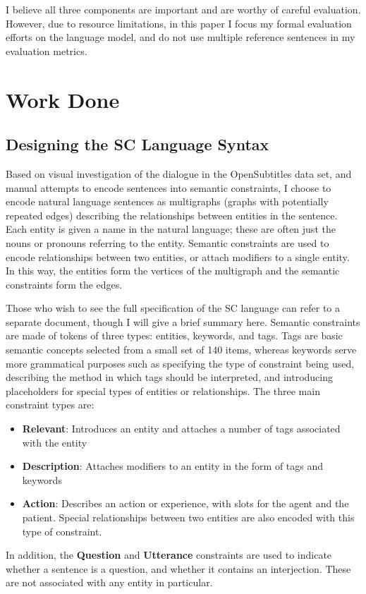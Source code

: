 \documentclass{article}
\numberwithin{equation}{section}
\begin{document}
I believe all three components are important and are worthy of careful evaluation. However, due to resource limitations, in this paper I focus my formal evaluation efforts on the language model, and do not use multiple reference sentences in my evaluation metrics.

\section{Work Done}

\subsection{Designing the SC Language Syntax}

Based on visual investigation of the dialogue in the OpenSubtitles data set, and manual attempts to encode sentences into semantic constraints, I choose to encode natural language sentences as multigraphs (graphs with potentially repeated edges) describing the relationships between entities in the sentence. Each entity is given a name in the natural language; these are often just the nouns or pronouns referring to the entity. Semantic constraints are used to encode relationships between two entities, or attach modifiers to a single entity. In this way, the entities form the vertices of the multigraph and the semantic constraints form the edges.

Those who wish to see the full specification of the SC language can refer to a separate document, though I will give a brief summary here. Semantic constraints are made of tokens of three types: entities, keywords, and tags. Tags are basic semantic concepts selected from a small set of 140 items, whereas keywords serve more grammatical purposes such as specifying the type of constraint being used, describing the method in which tags should be interpreted, and introducing placeholders for special types of entities or relationships. The three main constraint types are:
\begin{itemize}[topsep=0pt, partopsep=0pt, itemsep=2pt, parsep=0pt]
\item \textbf{Relevant}: Introduces an entity and attaches a number of tags associated with the entity
\item \textbf{Description}: Attaches modifiers to an entity in the form of tags and keywords
\item \textbf{Action}: Describes an action or experience, with slots for the agent and the patient. Special relationships between two entities are also encoded with this type of constraint.
\end{itemize}
In addition, the \textbf{Question} and \textbf{Utterance} constraints are used to indicate whether a sentence is a question, and whether it contains an interjection. These are not associated with any entity in particular.
\end{document}
